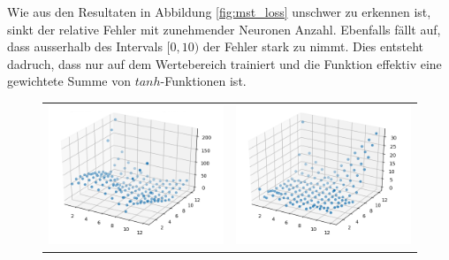 Wie aus den Resultaten in Abbildung \ref{fig:mst_loss} unschwer zu erkennen ist, sinkt der relative Fehler mit zunehmender Neuronen Anzahl. Ebenfalls fällt auf, dass ausserhalb des Intervals $[0, 10)$ der Fehler stark zu nimmt. Dies entsteht dadruch, dass nur auf dem Wertebereich trainiert und die Funktion effektiv eine gewichtete Summe von $tanh$-Funktionen ist.
\begin{figure}
	\centering
	\begin{tabular}{cc}
		\includegraphics[scale=0.4]{learning/img/abs_plot_2_clean.png} &
		\includegraphics[scale=0.4]{learning/img/abs_plot_6_clean.png} \\

\end{tabular}
\end{figure}
